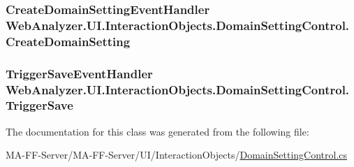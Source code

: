 \subsubsection[{Create\+Domain\+Setting}]{\setlength{\rightskip}{0pt plus 5cm}Create\+Domain\+Setting\+Event\+Handler Web\+Analyzer.\+U\+I.\+Interaction\+Objects.\+Domain\+Setting\+Control.\+Create\+Domain\+Setting}\label{class_web_analyzer_1_1_u_i_1_1_interaction_objects_1_1_domain_setting_control_aff18f63d7e7cb4b8c5d62b881bfc685c}
\hypertarget{class_web_analyzer_1_1_u_i_1_1_interaction_objects_1_1_domain_setting_control_a1daa9c774e823427b39110bc42ff0ccd}{}
\subsubsection[{Trigger\+Save}]{\setlength{\rightskip}{0pt plus 5cm}Trigger\+Save\+Event\+Handler Web\+Analyzer.\+U\+I.\+Interaction\+Objects.\+Domain\+Setting\+Control.\+Trigger\+Save}\label{class_web_analyzer_1_1_u_i_1_1_interaction_objects_1_1_domain_setting_control_a1daa9c774e823427b39110bc42ff0ccd}


The documentation for this class was generated from the following file\+:\begin{DoxyCompactItemize}
\item 
M\+A-\/\+F\+F-\/\+Server/\+M\+A-\/\+F\+F-\/\+Server/\+U\+I/\+Interaction\+Objects/\hyperlink{_domain_setting_control_8cs}{Domain\+Setting\+Control.\+cs}\end{DoxyCompactItemize}
